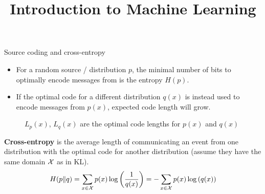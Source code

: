 \documentclass[11pt,compress,t,notes=noshow, xcolor=table]{beamer}
\title{Introduction to Machine Learning}
\date{}
\begin{document}



\begin{vbframe} {Source coding and cross-entropy}

\begin{itemize}
  \item For a random source / distribution $p$, the minimal number of bits to optimally encode messages from is the entropy $H(p)$.
  \item If the optimal code for a different distribution $q(x)$ is instead used to encode messages from $p(x)$, expected code length will grow.
\end{itemize}
  \vspace{-0.3cm}
  \begin{figure}
    \centering
      \caption{\footnotesize{$L_p(x)$, $L_q(x)$ are the optimal code lengths for $p(x)$ and $q(x)$}}
  \end{figure}

\framebreak
\textbf{Cross-entropy} is the average length of communicating an event from one distribution with the optimal code for another distribution (assume they have the same domain $\mathcal{X}$ as in KL).
  $$ H(p \| q) = \sum_{x \in \mathcal{X}} p(x) \log\left(\frac{1}{q(x)}\right) = - \sum_{x \in \mathcal{X}} p(x) \log\left(q(x)\right) $$


\end{vbframe}
\end{document}
